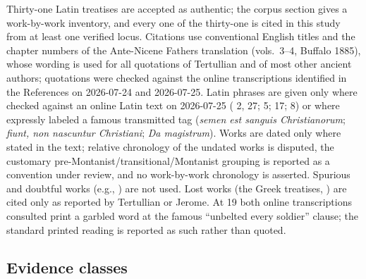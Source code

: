 Thirty-one Latin treatises are accepted as authentic; the corpus section
gives a work-by-work inventory, and every one of the thirty-one is cited in
this study from at least one verified locus. Citations use conventional English
titles and the chapter numbers of the Ante-Nicene Fathers translation
(vols.~3--4, Buffalo 1885), whose wording is used for all quotations of
Tertullian and of most other ancient authors; quotations were checked against
the online transcriptions identified in the References on 2026-07-24 and
2026-07-25. Latin phrases are given only where checked against an online
Latin text on 2026-07-25 ( 2, 27;  5;  17;  8) or
where expressly labeled a famous transmitted tag (\textit{semen est sanguis
Christianorum}; \textit{fiunt, non nascuntur Christiani}; \textit{Da
magistrum}). Works are dated only where stated in
the text; relative chronology of the undated works is disputed, the customary
pre-Montanist/transitional/Montanist grouping is reported as a convention
under review, and no work-by-work chronology is asserted. Spurious and
doubtful works (e.g., ) are not used. Lost works
(the Greek treatises, ) are cited only as reported by
Tertullian or Jerome. At  19 both online transcriptions
consulted print a garbled word at the famous ``unbelted every soldier''
clause; the standard printed reading is reported as such rather than quoted.

\subsection{Evidence classes}

\begin{evidencekey}
\end{evidencekey}

